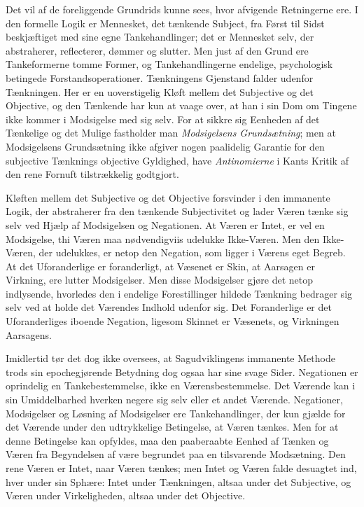 \documentclass[12pt]{book}
\begin{document}
Det vil af de foreliggende Grundrids kunne sees, hvor afvigende
Retningerne ere. I den formelle Logik er Mennesket, det tænkende Subject,
fra Først til Sidst beskjæftiget med sine egne Tankehandlinger; det
er Mennesket selv, der abstraherer, reflecterer, dømmer og slutter. Men
just af den Grund ere Tankeformerne tomme Former, og Tankehandlingerne
endelige, psychologisk betingede Forstandsoperationer. Tænkningens
Gjenstand falder udenfor Tænkningen. Her er en uoverstigelig
Kløft mellem det Subjective og det Objective, og den Tænkende har
kun at vaage over, at han i sin Dom om Tingene ikke kommer i Modsigelse
med sig selv. For at sikkre sig Eenheden af det Tænkelige og
det Mulige fastholder man \emph{Modsigelsens Grundsætning}; men
at Modsigelsens Grundsætning ikke afgiver nogen paalidelig Garantie
for den subjective Tænknings objective Gyldighed, have \emph{Antinomierne}
i Kants Kritik af den rene Fornuft tilstrækkelig godtgjort.

Kløften mellem det Subjective og det Objective forsvinder i den
immanente Logik, der abstraherer fra den tænkende Subjectivitet og
lader Væren tænke sig selv ved Hjælp af Modsigelsen og Negationen.
At Væren er Intet, er vel en Modsigelse, thi Væren maa nødvendigviis
udelukke Ikke-Væren. Men den Ikke-Væren, der udelukkes, er netop
den Negation, som ligger i Værens eget Begreb. At det Uforanderlige
er foranderligt, at Væsenet er Skin, at Aarsagen er Virkning, ere lutter
Modsigelser. Men disse Modsigelser gjøre det netop indlysende, hvorledes
den i endelige Forestillinger hildede Tænkning bedrager sig selv
ved at holde det Værendes Indhold udenfor sig. Det Foranderlige er
det Uforanderliges iboende Negation, ligesom Skinnet er Væsenets, og
Virkningen Aarsagens.

Imidlertid tør det dog ikke oversees, at Sagudviklingens immanente
Methode trods sin epochegjørende Betydning dog ogsaa har sine
svage Sider. Negationen er oprindelig en Tankebestemmelse, ikke en
Værensbestemmelse. Det Værende kan i sin Umiddelbarhed hverken negere
sig selv eller et andet Værende. Negationer, Modsigelser og Løsning
af Modsigelser ere Tankehandlinger, der kun gjælde for det Værende
under den udtrykkelige Betingelse, at Væren tænkes. Men for at
denne Betingelse kan opfyldes, maa den paaberaabte Eenhed af Tænken
og Væren fra Begyndelsen af være begrundet paa en tilsvarende Modsætning.
Den rene Væren er Intet, naar Væren tænkes; men Intet
og Væren falde desuagtet ind, hver under sin Sphære: Intet under
Tænkningen, altsaa under det Subjective, og Væren under Virkeligheden,
altsaa under det Objective.
\end{document}
